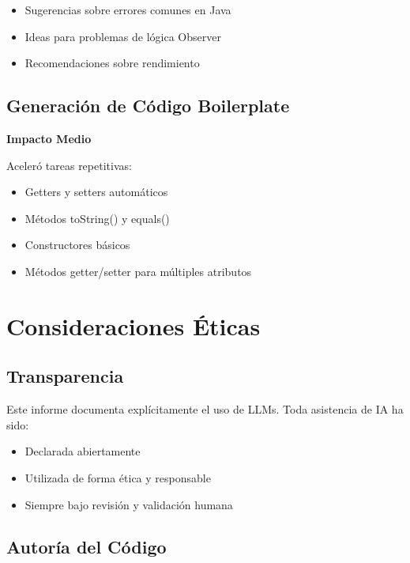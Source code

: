 \documentclass[12pt, a4paper]{article}
\begin{document}
\begin{itemize}[leftmargin=2em]
    \item Sugerencias sobre errores comunes en Java
    \item Ideas para problemas de lógica Observer
    \item Recomendaciones sobre rendimiento
\end{itemize}

\subsection{Generación de Código Boilerplate}

\textbf{Impacto Medio}

Aceleró tareas repetitivas:

\begin{itemize}[leftmargin=2em]
    \item Getters y setters automáticos
    \item Métodos toString() y equals()
    \item Constructores básicos
    \item Métodos getter/setter para múltiples atributos
\end{itemize}

\section{Consideraciones Éticas}

\subsection{Transparencia}

Este informe documenta explícitamente el uso de LLMs. Toda asistencia de IA ha sido:

\begin{itemize}[leftmargin=2em]
    \item Declarada abiertamente
    \item Utilizada de forma ética y responsable
    \item Siempre bajo revisión y validación humana
\end{itemize}

\subsection{Autoría del Código}
\end{document}
